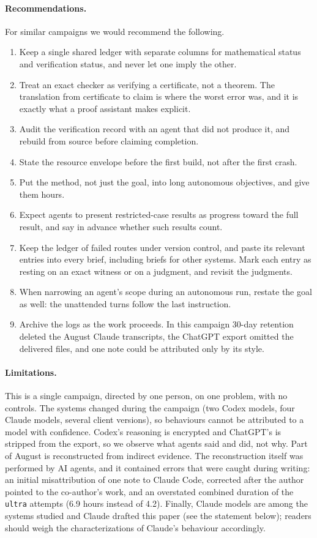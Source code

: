 \documentclass[11pt,a4paper]{article}
\newcommand{\ttt}[1]{\texttt{#1}}
\begin{document}
\paragraph{Recommendations.} For similar campaigns we would recommend the following.
\begin{enumerate}
\item Keep a single shared ledger with separate columns for mathematical status and verification status, and
  never let one imply the other.
\item Treat an exact checker as verifying a certificate, not a theorem. The translation from certificate to
  claim is where the worst error was, and it is exactly what a proof assistant makes explicit.
\item Audit the verification record with an agent that did not produce it, and rebuild from source before
  claiming completion.
\item State the resource envelope before the first build, not after the first crash.
\item Put the method, not just the goal, into long autonomous objectives, and give them hours.
\item Expect agents to present restricted-case results as progress toward the full result, and say in advance
  whether such results count.
\item Keep the ledger of failed routes under version control, and paste its relevant entries into every brief,
  including briefs for other systems. Mark each entry as resting on an exact witness or on a judgment, and
  revisit the judgments.
\item When narrowing an agent's scope during an autonomous run, restate the goal as well: the unattended turns
  follow the last instruction.
\item Archive the logs as the work proceeds. In this campaign 30-day retention deleted the August Claude
  transcripts, the ChatGPT export omitted the delivered files, and one note could be attributed only by its
  style.
\end{enumerate}

\paragraph{Limitations.} This is a single campaign, directed by one person, on one problem, with no controls.
The systems changed during the campaign (two Codex models, four Claude models, several client versions), so
behaviours cannot be attributed to a model with confidence. Codex's reasoning is encrypted and ChatGPT's is
stripped from the export, so we observe what agents said and did, not why. Part of August is reconstructed
from indirect evidence. The reconstruction itself was performed by AI agents, and it contained errors that
were caught during writing: an initial misattribution of one note to Claude Code, corrected after the author
pointed to the co-author's work, and an overstated combined duration of the \ttt{ultra} attempts (6.9 hours
instead of 4.2). Finally, Claude models are among the systems studied and Claude drafted this paper
(see the statement below); readers should weigh the characterizations of Claude's behaviour accordingly.
\end{document}

